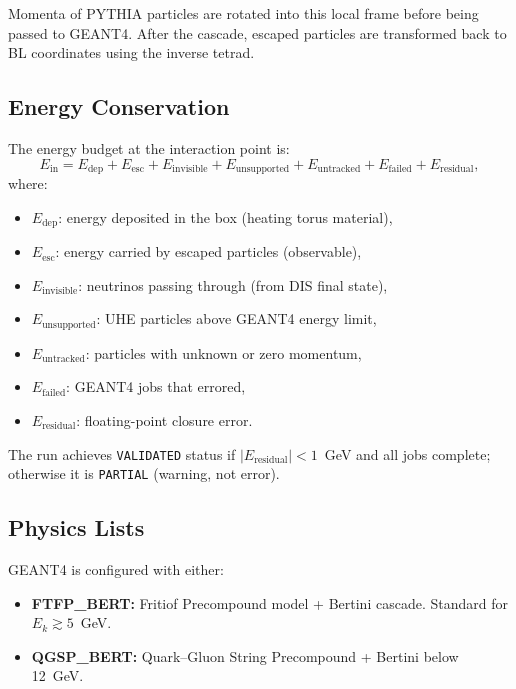 \documentclass[11pt,a4paper]{article}
\begin{document}
Momenta of PYTHIA particles are rotated into this local frame before being passed to GEANT4. After the cascade, escaped particles are transformed back to BL coordinates using the inverse tetrad.

\subsection{Energy Conservation}

The energy budget at the interaction point is:
\begin{equation}
  E_\mathrm{in} = E_\mathrm{dep} + E_\mathrm{esc} + E_\mathrm{invisible} + E_\mathrm{unsupported} + E_\mathrm{untracked} + E_\mathrm{failed} + E_\mathrm{residual},
  \label{eq:energy_budget}
\end{equation}
where:
\begin{itemize}
  \item $E_\mathrm{dep}$: energy deposited in the box (heating torus material),
  \item $E_\mathrm{esc}$: energy carried by escaped particles (observable),
  \item $E_\mathrm{invisible}$: neutrinos passing through (from DIS final state),
  \item $E_\mathrm{unsupported}$: UHE particles above GEANT4 energy limit,
  \item $E_\mathrm{untracked}$: particles with unknown or zero momentum,
  \item $E_\mathrm{failed}$: GEANT4 jobs that errored,
  \item $E_\mathrm{residual}$: floating-point closure error.
\end{itemize}

The run achieves \texttt{VALIDATED} status if $|E_\mathrm{residual}| < 1$~GeV and all jobs complete; otherwise it is \texttt{PARTIAL} (warning, not error).

\subsection{Physics Lists}

GEANT4 is configured with either:
\begin{itemize}
  \item \textbf{FTFP\_BERT:} Fritiof Precompound model + Bertini cascade. Standard for $E_k \gtrsim 5$~GeV.
  \item \textbf{QGSP\_BERT:} Quark--Gluon String Precompound + Bertini below 12~GeV.
\end{itemize}
\end{document}

